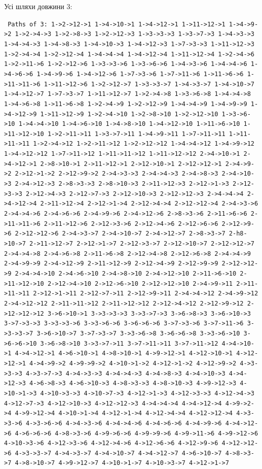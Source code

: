 \begin{framed}
  \noindent%
  Усі шляхи довжини 3:\\
  \raggedright\footnotesize\texttt{%
    Paths of 3: 1->2->12->1 1->4->10->1 1->4->12->1 1->11->12->1 1->4->9->2 1->2->4->3 1->2->8->3 1->2->12->3 1->3->3->3 1->3->7->3 1->4->3->3 1->4->4->3 1->4->8->3 1->4->10->3 1->4->12->3 1->7->3->3 1->11->12->3 1->2->4->4 1->2->12->4 1->4->4->4 1->4->12->4 1->11->12->4 1->2->4->6 1->2->11->6 1->2->12->6 1->3->3->6 1->3->6->6 1->4->3->6 1->4->4->6 1->4->6->6 1->4->9->6 1->4->12->6 1->7->3->6 1->7->11->6 1->11->6->6 1->11->11->6 1->11->12->6 1->2->12->7 1->3->3->7 1->4->3->7 1->4->10->7 1->4->12->7 1->7->3->7 1->11->12->7 1->2->4->8 1->3->6->8 1->4->4->8 1->4->6->8 1->11->6->8 1->2->4->9 1->2->12->9 1->4->4->9 1->4->9->9 1->4->12->9 1->11->12->9 1->2->4->10 1->2->8->10 1->2->12->10 1->3->6->10 1->4->4->10 1->4->6->10 1->4->8->10 1->4->12->10 1->11->6->10 1->11->12->10 1->2->11->11 1->3->7->11 1->4->9->11 1->7->11->11 1->11->11->11 1->2->4->12 1->2->11->12 1->2->12->12 1->4->4->12 1->4->9->12 1->4->12->12 1->7->11->12 1->11->11->12 1->11->12->12 2->4->10->1 2->4->12->1 2->8->10->1 2->11->12->1 2->12->10->1 2->12->12->1 2->4->9->2 2->12->1->2 2->12->9->2 2->4->3->3 2->4->4->3 2->4->8->3 2->4->10->3 2->4->12->3 2->8->3->3 2->8->10->3 2->11->12->3 2->12->1->3 2->12->3->3 2->12->4->3 2->12->7->3 2->12->10->3 2->12->12->3 2->4->4->4 2->4->12->4 2->11->12->4 2->12->1->4 2->12->4->4 2->12->12->4 2->4->3->6 2->4->4->6 2->4->6->6 2->4->9->6 2->4->12->6 2->8->3->6 2->11->6->6 2->11->11->6 2->11->12->6 2->12->3->6 2->12->4->6 2->12->6->6 2->12->9->6 2->12->12->6 2->4->3->7 2->4->10->7 2->4->12->7 2->8->3->7 2-h8->10->7 2->11->12->7 2->12->1->7 2->12->3->7 2->12->10->7 2->12->12->7 2->4->4->8 2->4->6->8 2->11->6->8 2->12->4->8 2->12->6->8 2->4->4->9 2->4->9->9 2->4->12->9 2->11->12->9 2->12->4->9 2->12->9->9 2->12->12->9 2->4->4->10 2->4->6->10 2->4->8->10 2->4->12->10 2->11->6->10 2->11->12->10 2->12->4->10 2->12->6->10 2->12->12->10 2->4->9->11 2->11->11->11 2->12->1->11 2->12->7->11 2->12->9->11 2->4->4->12 2->4->9->12 2->4->12->12 2->11->11->12 2->11->12->12 2->12->4->12 2->12->9->12 2->12->12->12 3->6->10->1 3->3->3->3 3->3->7->3 3->6->8->3 3->6->10->3 3->7->3->3 3->3->3->6 3->3->6->6 3->6->6->6 3->7->3->6 3->7->11->6 3->3->3->7 3->6->10->7 3->7->3->7 3->3->6->8 3->6->6->8 3->3->6->10 3->6->6->10 3->6->8->10 3->3->7->11 3->7->11->11 3->7->11->12 4->4->10->1 4->4->12->1 4->6->10->1 4->8->10->1 4->9->12->1 4->12->10->1 4->12->12->1 4->4->9->2 4->9->9->2 4->10->1->2 4->12->1->2 4->12->9->2 4->3->3->3 4->3->7->3 4->4->3->3 4->4->4->3 4->4->8->3 4->4->10->3 4->4->12->3 4->6->8->3 4->6->10->3 4->8->3->3 4->8->10->3 4->9->12->3 4->10->1->3 4->10->3->3 4->10->7->3 4->12->1->3 4->12->3->3 4->12->4->3 4->12->7->3 4->12->10->3 4->12->12->3 4->4->4->4 4->4->12->4 4->9->2->4 4->9->12->4 4->10->1->4 4->12->1->4 4->12->4->4 4->12->12->4 4->3->3->6 4->3->6->6 4->4->3->6 4->4->4->6 4->4->6->6 4->4->9->6 4->4->12->6 4->6->6->6 4->8->3->6 4->9->6->6 4->9->9->6 4->9->11->6 4->9->12->6 4->10->3->6 4->12->3->6 4->12->4->6 4->12->6->6 4->12->9->6 4->12->12->6 4->3->3->7 4->4->3->7 4->4->10->7 4->4->12->7 4->6->10->7 4->8->3->7 4->8->10->7 4->9->12->7 4->10->1->7 4->10->3->7 4->12->1->7 }
\end{framed}
